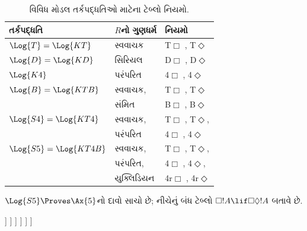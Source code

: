 \begin{table}
  \begin{center}
    \begin{tabular}{lll}
      \hline
      તર્કપદ્ધતિ & $R$નો ગુણધર્મ & નિયમો\\
      \hline
      $\Log{T} = \Log{KT}$ & સ્વવાચક &
      T$\Box$%
      , %
      T$\Diamond$
      \\ \hline
      $\Log{D} = \Log{KD}$ & સિરિયલ &
      D$\Box$%
      , %
      D$\Diamond$
      \\ \hline
      $\Log{K4}$ & પરંપરિત &
      4$\Box$%
      , %
      4$\Diamond$
      \\ \hline
      $\Log{B} = \Log{KTB}$ & સ્વવાચક, &
      T$\Box$%
      , %
      T$\Diamond$\\
      & સંમિત &
      B$\Box$%
      , %
      B$\Diamond$
      \\ \hline
      $\Log{S4} = \Log{KT4}$ & સ્વવાચક, &
      T$\Box$%
      , %
      T$\Diamond$,\\
      & પરંપરિત &
      4$\Box$%
      , %
      4$\Diamond$
      \\ \hline
      $\Log{S5} = \Log{KT4B}$ & સ્વવાચક, &
      T$\Box$%
      , %
      T$\Diamond$,\\
      & પરંપરિત, &
      4$\Box$%
      , %
      4$\Diamond$,\\
      &  યુક્લિડિયન &
      4r$\Box$%
      , %
      4r$\Diamond$
      \\ \hline
    \end{tabular}
  \end{center}
  \caption{વિવિધ મોડલ તર્કપદ્ધતિઓ માટેના ટેબ્લો નિયમો.}
\end{table}


\begin{ex}
  $\Log{S5} \Proves \Ax{5}$નો દાવો સાચો છે; નીચેનું બંધ ટેબ્લો
  $\Box!A \lif \Box\Diamond!A$ બતાવે છે.
  \begin{oltableau}
    [\pFmla{\False}{\Box\formula{A} \lif \Box\Diamond \formula{A}}{1},
      just = \TAss
      [\pFmla{\True}{\Box \formula{A}}{1}, just = {\TRule{\False}{\lif}[1]}
        [\pFmla{\False}{\Box\Diamond \formula{A}}{1},
          just = {\TRule{\False}{\lif}[1]}
          [\pFmla{\False}{\Diamond \formula{A}}{1.1},
            just = {\TRule{\False}{\Box}[3]}
            [\pFmla{\False}{\Diamond \formula{A}}{1},
              just = {4r$\Diamond$ 4}
              [\pFmla{\False}{\formula{A}}{1.1},
                just = {\TRule{\False}{\Diamond}[5]}
                [\pFmla{\True}{\formula{A}}{1.1},
                  just = {\TRule{\True}{\Box}[2]}, close]
              ]
            ]
          ]
        ]
      ]
    ]
  \end{oltableau}
\end{ex}

